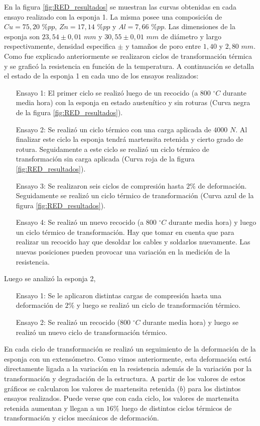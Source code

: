 \documentclass[a4paper,12pt,fleqn,twoside,openany]{book}
\begin{document}
En la figura \ref{fig:RED_resultados} se muestran las curvas obtenidas en cada ensayo realizado con la esponja 1. La misma posee una composición de $Cu=75,20$ $\%pp$, $Zn=17,14$ $\%pp$ y $Al=7,66$ $\%pp$. Las dimensiones de la esponja son $23,54 \pm0,01$ $mm$ y $30,55 \pm0,01$ $mm$ de diámetro y largo respectivamente, densidad especifica $ \pm $ y tamaños de poro entre $1,40$ y $2,80$ $mm$.
 Como fue explicado anteriormente se realizaron ciclos de transformación térmica y se graficó la resistencia en función de la temperatura. 
A continuación se detalla el estado de la esponja 1 en cada uno de los ensayos realizados: 
\begin{itemize}
 \item[Ensayo 1:] El primer ciclo se realizó luego de un recocido (a $800$ $^\circ C$ durante media hora) con la esponja en estado austenítico y sin roturas (Curva negra de la figura \ref{fig:RED_resultados}).
 \item[Ensayo 2:] Se realizó un ciclo térmico con una carga aplicada de $4000$ $N$. Al finalizar este ciclo la esponja tendrá martensita retenida y cierto grado de rotura. Seguidamente a este ciclo se realizó un ciclo térmico de transformación sin carga aplicada (Curva roja de la figura \ref{fig:RED_resultados}).
 \item[Ensayo 3:] Se realizaron seis ciclos de compresión hasta $2\%$ de deformación. Seguidamente se realizó un ciclo térmico de transformación (Curva azul de la figura \ref{fig:RED_resultados}).
 \item[Ensayo 4:] Se realizó un nuevo recocido (a $800$ $^\circ C$ durante media hora) y luego un ciclo térmico de transformación. Hay que tomar en cuenta que para realizar un recocido hay que desoldar los cables y soldarlos nuevamente. Las nuevas posiciones pueden provocar una variación en la medición de la resistencia.
 \end{itemize}
Luego se analizó la esponja 2, 
\begin{itemize}
 \item[Ensayo 1:] Se le aplicaron distintas cargas de compresión hasta una deformación de $2\%$ y luego se realizó un ciclo de transformación térmico.
 \item[Ensayo 2:] Se realizó un recocido ($800$ $^\circ C$ durante media hora) y luego se realizó un nuevo ciclo de transformación térmico.
\end{itemize}


En cada ciclo de transformación se realizó un seguimiento de la deformación de la esponja con un extensómetro. Como vimos anteriormente, esta deformación está directamente ligada a la variación en la resistencia además de la variación por la transformación y degradación de la estructura. A partir de los valores de estos gráficos   
se calcularon los valores de martensita retenida ($b$) para los distintos ensayos realizados. Puede verse que con cada ciclo, los valores de martensita retenida aumentan y llegan a un $16\%$ luego de distintos ciclos térmicos de transformación y ciclos mecánicos de deformación. 
\end{document}
